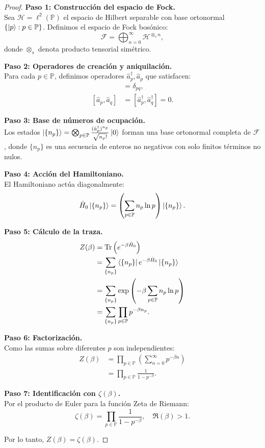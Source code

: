 \documentclass[11pt, a4paper]{article}
\theoremstyle{plain}
\theoremstyle{definition}
\begin{document}
\begin{proof}
\textbf{Paso 1: Construcción del espacio de Fock.} \\
Sea $\mathcal{H} = \ell^2(\mathbb{P})$ el espacio de Hilbert separable con base ortonormal $\{\ket{p} : p \in \mathbb{P}\}$. Definimos el espacio de Fock bosónico:
\begin{equation}
\mathcal{F} = \bigoplus_{n=0}^\infty \mathcal{H}^{\otimes_s n},
\end{equation}
donde $\otimes_s$ denota producto tensorial simétrico.

\textbf{Paso 2: Operadores de creación y aniquilación.} \\
Para cada $p \in \mathbb{P}$, definimos operadores $\hat{a}_p^\dagger, \hat{a}_p$ que satisfacen:
\begin{align}
[\hat{a}_p, \hat{a}_q^\dagger] &= \delta_{pq}, \\
[\hat{a}_p, \hat{a}_q] &= [\hat{a}_p^\dagger, \hat{a}_q^\dagger] = 0.
\end{align}

\textbf{Paso 3: Base de números de ocupación.} \\
Los estados $\ket{\{n_p\}} = \bigotimes_{p \in \mathbb{P}} \frac{(\hat{a}_p^\dagger)^{n_p}}{\sqrt{n_p!}} \ket{0}$ forman una base ortonormal completa de $\mathcal{F}$, donde $\{n_p\}$ es una secuencia de enteros no negativos con solo finitos términos no nulos.

\textbf{Paso 4: Acción del Hamiltoniano.} \\
El Hamiltoniano actúa diagonalmente:
\begin{equation}
\hat{H}_0 \ket{\{n_p\}} = \left(\sum_{p \in \mathbb{P}} n_p \ln p\right) \ket{\{n_p\}}.
\end{equation}

\textbf{Paso 5: Cálculo de la traza.}
\begin{align*}
Z(\beta) &= \Tr\left(e^{-\beta \hat{H}_0}\right) \\
&= \sum_{\{n_p\}} \bra{\{n_p\}} e^{-\beta \hat{H}_0} \ket{\{n_p\}} \\
&= \sum_{\{n_p\}} \exp\left(-\beta \sum_{p \in \mathbb{P}} n_p \ln p\right) \\
&= \sum_{\{n_p\}} \prod_{p \in \mathbb{P}} p^{-\beta n_p}.
\end{align*}

\textbf{Paso 6: Factorización.} \\
Como las sumas sobre diferentes $p$ son independientes:
\begin{align*}
Z(\beta) &= \prod_{p \in \mathbb{P}} \left( \sum_{n=0}^\infty p^{-\beta n} \right) \\
&= \prod_{p \in \mathbb{P}} \frac{1}{1 - p^{-\beta}}.
\end{align*}

\textbf{Paso 7: Identificación con $\zeta(\beta)$.} \\
Por el producto de Euler para la función Zeta de Riemann:
\begin{equation}
\zeta(\beta) = \prod_{p \in \mathbb{P}} \frac{1}{1 - p^{-\beta}}, \quad \Re(\beta) > 1.
\end{equation}

Por lo tanto, $Z(\beta) = \zeta(\beta)$.
\end{proof}
\end{document}
